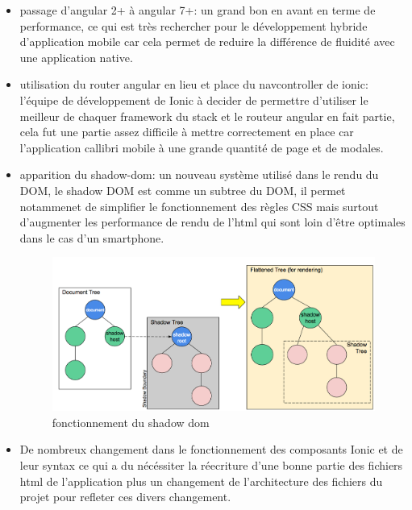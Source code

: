 \begin{itemize}
	\item passage d'angular 2+ à angular 7+: un grand bon en avant en terme de performance, ce qui 
	est très rechercher pour le développement hybride d'application mobile car cela permet de reduire 
	la différence de fluidité avec une application native. \newline

	\item utilisation du router angular en lieu et place du navcontroller de ionic:
	l'équipe de développement de Ionic à decider de permettre d'utiliser le meilleur 
	de chaquer framework du stack et le routeur angular en fait partie, cela fut une 
	partie assez difficile à mettre correctement en place car l'application 
	callibri mobile à une grande quantité de page et de modales. \newline 

	\item apparition du shadow-dom: un nouveau système utilisé dans le rendu du DOM,
	le shadow DOM est comme un subtree du DOM, il permet notammenet de simplifier 
	le fonctionnement des règles CSS mais surtout d'augmenter les performance de rendu 
	de l'html qui sont loin d'être optimales dans le cas d'un smartphone. \newline
	\begin{figure}[!h]
		\centering
		\includegraphics[width=1\linewidth]{Images/shadow}
		\caption{fonctionnement du shadow dom}
		\label{fig:archhexa}
	\end{figure}

	\item De nombreux changement dans le fonctionnement des composants Ionic et de leur 
	syntax ce qui a du nécéssiter la réecriture d'une bonne partie des fichiers html 
	de l'application plus un changement de l'architecture des fichiers du projet 
	pour refleter ces divers changement. \newline
\end{itemize}


